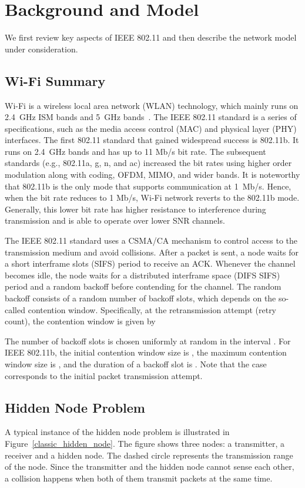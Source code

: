 \documentclass{IEEEtran}
\begin{document}
\section{Background and Model}
\label{Background}
We first review key aspects of IEEE 802.11 and then describe the network model under consideration.

\subsection{Wi-Fi Summary}
\label{Wi-Fi Summary}
Wi-Fi is a wireless local area network (WLAN) technology, which mainly
runs on 2.4~GHz ISM bands and 5~GHz bands~\cite{gast2005802}. The IEEE 802.11 standard is a
series of specifications, such as the media access control (MAC) and
physical layer (PHY) interfaces. The first 802.11 standard
that gained widespread success is 802.11b.
It runs on 2.4~GHz bands and
has up to 11 Mb/s bit rate.
The subsequent standards (e.g., 802.11a, g, n, and
ac) increased the bit rates using higher order modulation along with
coding, OFDM, MIMO, and wider bands.
It is noteworthy
that 802.11b is the only mode that supports communication at 1~Mb/s. Hence, when the
bit rate reduces to 1 Mb/s, Wi-Fi network reverts to the
802.11b mode. Generally, this lower bit rate has higher resistance to
interference during transmission and is able to operate over lower SNR channels.

The IEEE 802.11 standard uses a CSMA/CA mechanism to control access to
the transmission medium and avoid collisions.
After a packet is sent, a
node waits for a short interframe slots (SIFS) period to receive an
ACK. Whenever the channel becomes idle, the node waits for a distributed
interframe space (DIFS  SIFS) period and a random backoff before contending for the channel.
The random backoff consists of a random number of backoff slots, which depends on the so-called contention window.
Specifically, at the  retransmission attempt (retry count), the contention window  is given by

The number of backoff slots is chosen uniformly at random in the interval .
For IEEE 802.11b, the initial contention window size is  , the maximum contention window size is , and the duration of a
backoff slot is .
Note that the case  corresponds to the initial packet transmission attempt. 




\subsection{Hidden Node Problem}
\label{Hidden Node Problem}
A typical instance of the hidden node problem is illustrated in
Figure~\ref{classic_hidden_node}. The figure shows three nodes: a transmitter,
a receiver and a hidden node. The dashed circle represents the
transmission range of the node. Since the transmitter and the hidden
node cannot sense each other, a collision happens when both of them
transmit packets at the same time.
\end{document}
